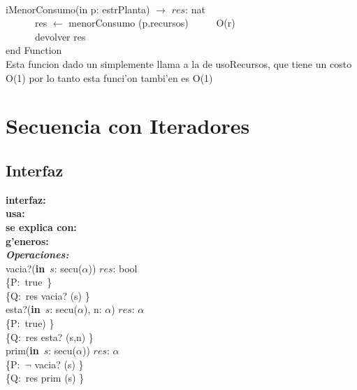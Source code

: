 \documentclass[a4paper,10pt]{article}
\begin{document}
\begin{algoritmo}
\caption{}\\
  iMenorConsumo(in p: estrPlanta) $\rightarrow$ $res$: nat \\
	\indent \ \ \ \ \ \  res $\gets$ menorConsumo (p.recursos)  \ \ \ \ \ O(r)\\
	\indent \ \ \ \ \ \  devolver res    \\
   end Function \\

Esta funcion dado un simplemente llama a la de usoRecursos, que tiene un costo O(1) por lo tanto esta funci'on tambi'en es O(1)
\end{algoritmo}

\newpage

\section{Secuencia con Iteradores}

\subsection{Interfaz}

\indent \noindent \textbf{interfaz:} \\
\indent \textbf{usa:}\\
\indent \textbf{se explica con:} \\
\indent \textbf{g'eneros:} \\

\noindent \textbf{\textsl{Operaciones:}}\\

\noindent vacia?(\textbf{in}\ $s$: secu($\alpha$))  \en $res$: bool \ \ \ \ \ \\
\indent \{P:\ true\ \}  \\
\indent \{Q:\ res \igobs vacia? (s) \}\\

\noindent esta?(\textbf{in}\ $s$: secu($\alpha$), n: $\alpha$)  \en $res$: $\alpha$ \ \ \ \ \ \\
\indent \{P:\ true) \}  \\
\indent \{Q:\ res \igobs esta? (s,n) \}\\

\noindent prim(\textbf{in}\ $s$: secu($\alpha$))  \en $res$: $\alpha$ \ \ \ \ \ \\
\indent \{P:\ $\neg$ vacia? (s) \}  \\
\indent \{Q:\ res \igobs prim (s) \}\\
\end{document}
